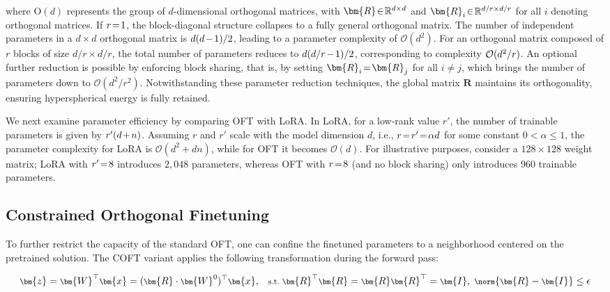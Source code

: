 where $\text{O}(d)$ represents the group of $d$-dimensional orthogonal matrices, with $\thickmuskip=2mu \medmuskip=2mu \bm{R}\in\mathbb{R}^{d\times d}$ and $\thickmuskip=2mu \medmuskip=2mu \bm{R}_i\in\mathbb{R}^{d/r\times d/r}$ for all $i$ denoting orthogonal matrices. If $\thickmuskip=2mu \medmuskip=2mu r=1$, the block-diagonal structure collapses to a fully general orthogonal matrix. The number of independent parameters in a $d\times d$ orthogonal matrix is $\thickmuskip=2mu \medmuskip=2mu d(d-1)/2$, leading to a parameter complexity of $\mathcal{O}(d^2)$. For an orthogonal matrix composed of $r$ blocks of size $d/r \times d/r$, the total number of parameters reduces to $\thickmuskip=2mu \medmuskip=2mu d(d/r-1)/2$, corresponding to complexity $\thickmuskip=2mu \medmuskip=2mu \mathcal{O}(d^2/r)$. An optional further reduction is possible by enforcing block sharing, that is, by setting $\thickmuskip=2mu \medmuskip=2mu\bm{R}_i=\bm{R}_j$ for all $i\neq j$, which brings the number of parameters down to $\mathcal{O}(d^2/r^2)$. Notwithstanding these parameter reduction techniques, the global matrix $\bm{R}$ maintains its orthogonality, ensuring hyperspherical energy is fully retained.

We next examine parameter efficiency by comparing OFT with LoRA. In LoRA, for a low-rank value $r'$, the number of trainable parameters is given by $\thickmuskip=2mu \medmuskip=2mu r'(d+n)$. Assuming $r$ and $r'$ scale with the model dimension $d$, i.e., $\thickmuskip=2mu \medmuskip=2mu r=r'=\alpha d$ for some constant $0<\alpha\leq1$, the parameter complexity for LoRA is $\mathcal{O}(d^2+dn)$, while for OFT it becomes $\mathcal{O}(d)$. For illustrative purposes, consider a $128\times 128$ weight matrix; LoRA with $\thickmuskip=2mu \medmuskip=2mu r'=8$ introduces $2,048$ parameters, whereas OFT with $\thickmuskip=2mu \medmuskip=2mu r=8$ (and no block sharing) only introduces $960$ trainable parameters.

\subsection{Constrained Orthogonal Finetuning}

To further restrict the capacity of the standard OFT, one can confine the finetuned parameters to a neighborhood centered on the pretrained solution. The COFT variant applies the following transformation during the forward pass:

\begin{equation}\label{eq:coft_general}
    \footnotesize
    \bm{z}=\bm{W}^\top\bm{x}=(\bm{R}\cdot\bm{W}^0)^\top\bm{x},~~~\text{s.t.}~\bm{R}^\top\bm{R}=\bm{R}\bm{R}^\top=\bm{I},~\norm{\bm{R}-\bm{I}}\leq \epsilon
\end{equation}


